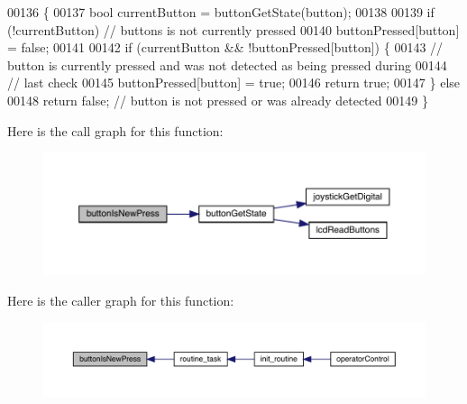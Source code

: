 \begin{DoxyCode}
00136                                        \{
00137   \textcolor{keywordtype}{bool} currentButton = buttonGetState(button);
00138 
00139   \textcolor{keywordflow}{if} (!currentButton) \textcolor{comment}{// buttons is not currently pressed}
00140     buttonPressed[button] = \textcolor{keyword}{false};
00141 
00142   \textcolor{keywordflow}{if} (currentButton && !buttonPressed[button]) \{
00143     \textcolor{comment}{// button is currently pressed and was not detected as being pressed during}
00144     \textcolor{comment}{// last check}
00145     buttonPressed[button] = \textcolor{keyword}{true};
00146     \textcolor{keywordflow}{return} \textcolor{keyword}{true};
00147   \} \textcolor{keywordflow}{else}
00148     \textcolor{keywordflow}{return} \textcolor{keyword}{false}; \textcolor{comment}{// button is not pressed or was already detected}
00149 \}
\end{DoxyCode}
Here is the call graph for this function\+:
\nopagebreak
\begin{figure}[H]
\begin{center}
\leavevmode
\includegraphics[width=350pt]{toggle_8h_ae819f86fad1b51d66f4294140b53ff77_cgraph}
\end{center}
\end{figure}
Here is the caller graph for this function\+:
\nopagebreak
\begin{figure}[H]
\begin{center}
\leavevmode
\includegraphics[width=350pt]{toggle_8h_ae819f86fad1b51d66f4294140b53ff77_icgraph}
\end{center}
\end{figure}
